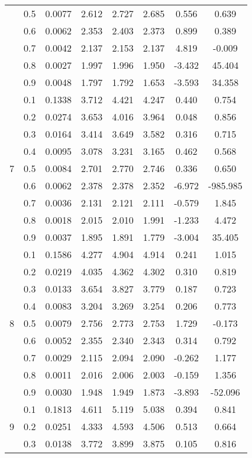 \documentclass[11pt,a4paper]{report}
\begin{document}
\begin{longtable}{ | c | c || c | c | c | c | c | c | }
 & 0.5 & 0.0077 & 2.612 & 2.727 & 2.685 & 0.556 & 0.639 \\
 & 0.6 & 0.0062 & 2.353 & 2.403 & 2.373 & 0.899 & 0.389 \\
 & 0.7 & 0.0042 & 2.137 & 2.153 & 2.137 & 4.819 & -0.009 \\
 & 0.8 & 0.0027 & 1.997 & 1.996 & 1.950 & -3.432 & 45.404 \\
 & 0.9 & 0.0048 & 1.797 & 1.792 & 1.653 & -3.593 & 34.358 \\
 \hline
\multirow{9}{*}{7} & 0.1 & 0.1338 & 3.712 & 4.421 & 4.247 & 0.440 & 0.754 \\
 & 0.2 & 0.0274 & 3.653 & 4.016 & 3.964 & 0.048 & 0.856 \\
 & 0.3 & 0.0164 & 3.414 & 3.649 & 3.582 & 0.316 & 0.715 \\
 & 0.4 & 0.0095 & 3.078 & 3.231 & 3.165 & 0.462 & 0.568 \\
 & 0.5 & 0.0084 & 2.701 & 2.770 & 2.746 & 0.336 & 0.650 \\
 & 0.6 & 0.0062 & 2.378 & 2.378 & 2.352 & -6.972 & -985.985 \\
 & 0.7 & 0.0036 & 2.131 & 2.121 & 2.111 & -0.579 & 1.845 \\
 & 0.8 & 0.0018 & 2.015 & 2.010 & 1.991 & -1.233 & 4.472 \\
 & 0.9 & 0.0037 & 1.895 & 1.891 & 1.779 & -3.004 & 35.405 \\
 \hline
\multirow{9}{*}{8} & 0.1 & 0.1586 & 4.277 & 4.904 & 4.914 & 0.241 & 1.015 \\
 & 0.2 & 0.0219 & 4.035 & 4.362 & 4.302 & 0.310 & 0.819 \\
 & 0.3 & 0.0133 & 3.654 & 3.827 & 3.779 & 0.187 & 0.723 \\
 & 0.4 & 0.0083 & 3.204 & 3.269 & 3.254 & 0.206 & 0.773 \\
 & 0.5 & 0.0079 & 2.756 & 2.773 & 2.753 & 1.729 & -0.173 \\
 & 0.6 & 0.0052 & 2.355 & 2.340 & 2.343 & 0.314 & 0.792 \\
 & 0.7 & 0.0029 & 2.115 & 2.094 & 2.090 & -0.262 & 1.177 \\
 & 0.8 & 0.0011 & 2.016 & 2.006 & 2.003 & -0.159 & 1.356 \\
 & 0.9 & 0.0030 & 1.948 & 1.949 & 1.873 & -3.893 & -52.096 \\
 \hline
\multirow{9}{*}{9} & 0.1 & 0.1813 & 4.611 & 5.119 & 5.038 & 0.394 & 0.841 \\
 & 0.2 & 0.0251 & 4.333 & 4.593 & 4.506 & 0.513 & 0.664 \\
 & 0.3 & 0.0138 & 3.772 & 3.899 & 3.875 & 0.105 & 0.816 \\

\end{longtable}
\end{document}
